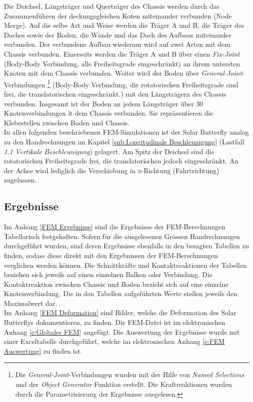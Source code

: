 Die Deichsel, Längsträger und Querträger des Chassis werden durch das Zusammenführen der deckungsgleichen Koten miteinander verbunden (Node Merge). Auf die selbe Art und Weise werden die Träger A und B, die Träger des Daches sowie der Boden, die Wände und das Dach des Aufbaus miteinander verbunden. Der verbundene Aufbau wiederum wird auf zwei Arten mit dem Chassis verbunden. Einerseits werden die Träger A und B über einen \emph{Fix-Joint} (Body-Body Verbindung, alle Freiheitsgrade eingeschränkt) an ihrem untersten Knoten mit dem Chassis verbunden. Weiter wird der Boden über \emph{General-Joint}-Verbindungen%
\footnote{Die \emph{General-Joint}-Verbindungen wurden mit der Hilfe von \emph{Named Selections} und der \emph{Object Generator} Funktion erstellt. Die Kraftreaktionen wurden durch die Parametrisierung der Ergebnisse ausgelesen.}
(Body-Body Verbindung, die rotatorischen Freiheitsgrade sind frei, die translatorischen eingeschränkt.) mit den Längsträgern des Chassis verbunden. Insgesamt ist der Boden an jedem Längsträger über 30 Knotenverbindungen it dem Chassis verbunden. Sie repräsentieren die Klebestellen zwischen Boden und Chassis.\\
In allen folgenden beschriebenen FEM-Simulationen ist der Solar Butterfly analog zu den Handrechnungen im Kapitel \ref{sub:Longitudinale Beschleunigung} (Lastfall \emph{1.1 Vertikale Beschleunigung}) gelagert. Am Spitz der Deichsel sind die rotatorischen Freiheitsgrade frei, die translatorischen jedoch eingeschränkt. An der Achse wird lediglich die Verschiebung in x-Richtung (Fahrtrichtung) zugelassen.


\subsection{Ergebnisse}
Im Anhang \ref{FEM Ergebnisse} sind die Ergebnisse der FEM-Berechnungen Tabellarisch festgehalten. Sofern für die ausgelesenen Grössen Handrechnungen durchgeführt wurden, sind deren Ergebnisse ebenfalls in den besagten Tabellen zu finden, sodass diese direkt mit den Ergebnissen der FEM-Berechnungen verglichen werden können. Die Schnittkräfte und Kontaktreaktionen der Tabellen beziehen sich jeweils auf einen einzelnen Balken oder Verbindung. Die Kontaktreaktion zwischen Chassis und Boden bezieht sich auf eine einzelne Knotenverbindung. Die in den Tabellen aufgeführten Werte stellen jeweils den Maximalwert dar.\\
Im Anhang \ref{FEM Deformation} sind Bilder, welche die Deformation des Solar Butterflys dokumentieren, zu finden. Die FEM-Datei ist im elektronischen Anhang \ref{e:Globales FEM} angefügt. Die Auswertung der Ergebnisse wurde mit einer Exceltabelle durchgeführt, welche im elektronischen Anhang \ref{e:FEM Auswertung} zu finden ist.

